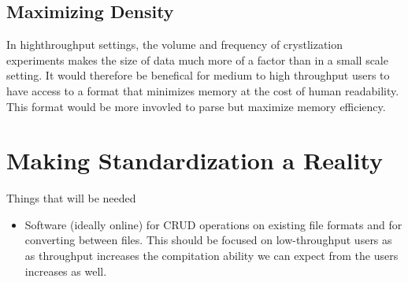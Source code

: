 \documentclass[]{article}
\begin{document}
\subsection{Maximizing Density}

In highthroughput settings, the volume and frequency of crystlization experiments makes the size of data much more of a factor than in a small scale setting. It would therefore be benefical for medium to high throughput users to have access to a format that minimizes memory at the cost of human readability. This format would be more invovled to parse but maximize memory efficiency. 

\section{Making Standardization a Reality}

Things that will be needed

\begin{itemize}
	\item Software (ideally online) for CRUD operations on existing file formats and for converting between files. This should be focused on low-throughput users as as throughput increases the compitation ability we can expect from the users increases as well. 
\end{itemize}



\end{document}
